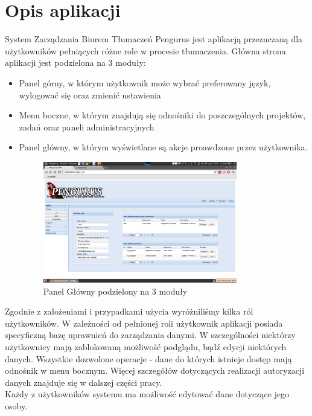 \documentclass[licencjacka]{pracamgr}
\begin{document}
\section{Opis aplikacji}
System Zarządzania Biurem Tłumaczeń Pengurus jest aplikacją przeznczaną dla użytkowników pełniących różne role w procesie tłumaczenia.
Główna strona aplikacji jest podzielona na 3 moduły:
\begin{itemize}
\item Panel górny, w którym użytkownik może wybrać preferowany język, wylogować się oraz zmienić ustawienia
\item  Menu boczne, w którym znajdują się odnośniki do poszczególnych projektów, zadań oraz paneli administracyjnych
\item  Panel główny, w którym wyświetlane są akcje proawdzone przez użytkownika.  
\begin{figure}[ht!]
\centering
\includegraphics[width=0.8\textwidth]{resources/panel_glowny.png}
\caption{Panel Główny podzielony na 3 moduły}
\end{figure}
\end{itemize}

Zgodnie z założeniami i przypadkami użycia wyróżniliśmy kilka ról użytkowników. W zależności od pełnionej roli użytkownik aplikacji posiada specyficzną bazę uprawnień do zarządzania danymi. W szczególności niektórzy użytkownicy mają zablokowaną możliwość podglądu, bądź edycji niektórych danych. Wszystkie dozwolone operacje - dane do których istnieje dostęp mają odnośnik w menu bocznym.
Więcej szczegółów dotyczących realizacji autoryzacji danych znajduje się w dalszej części pracy.\\

Każdy z użytkowników systemu ma możliwość edytować dane dotyczące jego osoby.\\ 
\end{document}
